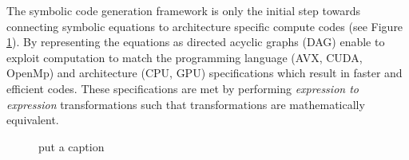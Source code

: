 \documentclass[10pt, conference]{IEEEtran} %
\begin{document}
The symbolic code generation framework is only the initial step towards connecting symbolic equations to architecture specific compute codes (see Figure \ref{fig:sym_framwork}). By representing the equations as directed acyclic graphs (DAG) enable to exploit computation to match the programming language (AVX, CUDA, OpenMp) and architecture (CPU, GPU) specifications which result in faster and efficient codes. These specifications are met by performing \textit{expression to expression} transformations such that transformations are mathematically equivalent. 

\begin{figure}

%
	\caption{ put a caption \label{fig:sym_framwork}}
\end{figure}
\end{document}
